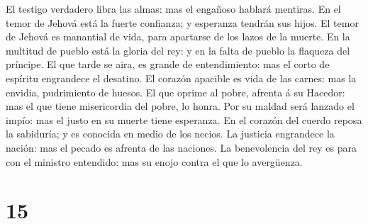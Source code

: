 El testigo verdadero libra las almas: mas el engañoso hablará mentiras.
 En el temor de Jehová está la fuerte confianza; y
esperanza tendrán sus hijos.  El temor de Jehová es
manantial de vida, para apartarse de los lazos de la muerte.
 En la multitud de pueblo está la gloria del rey: y en la
falta de pueblo la flaqueza del príncipe.  El que tarde
se aira, es grande de entendimiento: mas el corto de espíritu engrandece
el desatino.  El corazón apacible es vida de las carnes:
mas la envidia, pudrimiento de huesos.  El que oprime al
pobre, afrenta á su Hacedor: mas el que tiene misericordia del pobre, lo
honra.  Por su maldad será lanzado el impío: mas el justo
en su muerte tiene esperanza.  En el corazón del cuerdo
reposa la sabiduría; y es conocida en medio de los necios.
 La justicia engrandece la nación: mas el pecado es
afrenta de las naciones.  La benevolencia del rey es para
con el ministro entendido: mas su enojo contra el que lo avergüenza.

\hypertarget{section-14}{%
\section{15}\label{section-14}}

